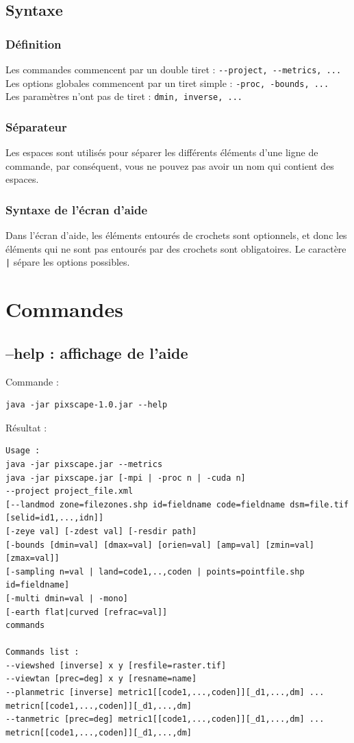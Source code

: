 \documentclass{report}
\begin{document}
\subsection{Syntaxe}
\subsubsection{Définition}
Les commandes commencent par un double tiret : \verb|--project, --metrics, ...|\\
Les options globales commencent par un tiret simple : \verb|-proc, -bounds, ...|\\
Les paramètres n'ont pas de tiret : \verb|dmin, inverse, ...|

\subsubsection{Séparateur}
Les espaces sont utilisés pour séparer les différents éléments d'une ligne de commande, par conséquent, vous ne pouvez pas avoir un nom qui contient des espaces.\\

\subsubsection{Syntaxe de l'écran d'aide}
Dans l'écran d'aide, les éléments entourés de crochets sont optionnels, et donc les éléments qui ne sont pas entourés par des crochets sont obligatoires. Le caractère \verb+|+ sépare les options possibles.

\section{Commandes}

\subsection{--help : affichage de l'aide}
Commande :
\begin{Verbatim}
java -jar pixscape-1.0.jar --help
\end{Verbatim}
Résultat :
\begin{Verbatim}
Usage :
java -jar pixscape.jar --metrics
java -jar pixscape.jar [-mpi | -proc n | -cuda n]
--project project_file.xml
[--landmod zone=filezones.shp id=fieldname code=fieldname dsm=file.tif [selid=id1,...,idn]]
[-zeye val] [-zdest val] [-resdir path]
[-bounds [dmin=val] [dmax=val] [orien=val] [amp=val] [zmin=val] [zmax=val]]
[-sampling n=val | land=code1,..,coden | points=pointfile.shp id=fieldname]
[-multi dmin=val | -mono]
[-earth flat|curved [refrac=val]]
commands

Commands list :
--viewshed [inverse] x y [resfile=raster.tif]
--viewtan [prec=deg] x y [resname=name]
--planmetric [inverse] metric1[[code1,...,coden]][_d1,...,dm] ... metricn[[code1,...,coden]][_d1,...,dm]
--tanmetric [prec=deg] metric1[[code1,...,coden]][_d1,...,dm] ... metricn[[code1,...,coden]][_d1,...,dm]
\end{Verbatim}
\end{document}
